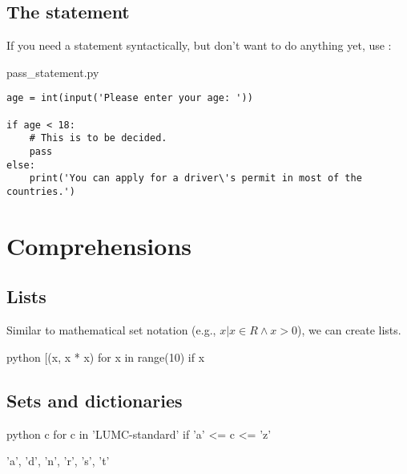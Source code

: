 \documentclass[aspectratio=1610,t]{beamer}
\begin{document}
\subsection{The  statement}
\begin{pframe}
 If you need a statement syntactically, but don't want to do anything yet, use :
 \begin{pythonfile}{pass\_statement.py}
  \begin{verbatim}
age = int(input('Please enter your age: '))

if age < 18:
    # This is to be decided.
    pass
else:
    print('You can apply for a driver\'s permit in most of the countries.')
  \end{verbatim}
 \end{pythonfile}
\end{pframe}



\section{Comprehensions}
\makeTableOfContentsSection

\subsection{Lists}
\begin{pframe}
 Similar to mathematical set notation (e.g., ${x | x \in R \wedge x>0}$), we can create lists.
 \begin{ipython}
  \begin{pythonin}{python}
[(x, x * x) for x in range(10) if x %
  \end{pythonin}
  \begin{pythonout}
[(1, 1), (3, 9), (5, 25), (7, 49), (9, 81)]
  \end{pythonout}
 \end{ipython}
\end{pframe}


\subsection{Sets and dictionaries}
\begin{pframe}
 \begin{ipython}
  \begin{pythonin}{python}
{c for c in 'LUMC-standard' if 'a' <= c <= 'z'}
  \end{pythonin}
  \begin{pythonout}
{'a', 'd', 'n', 'r', 's', 't'}
  \end{pythonout}
 \end{ipython}
\end{pframe}
\end{document}
